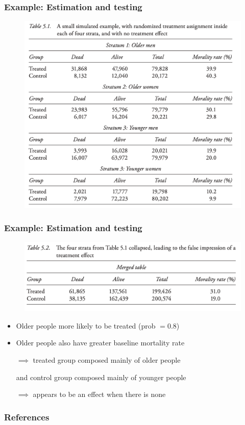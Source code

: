 \documentclass[table, xcolor = {dvipsnames}, 9pt]{beamer}
\theoremstyle{plain}
\begin{document}
\begin{frame}[t]
\frametitle{Example: Estimation and testing}
\vfill
\begin{figure}
\includegraphics[width = 0.8\linewidth]{figures/Rosenbaum_2017_Table_5.1.png}
\caption{\citep[][p.~67]{rosenbaum2017}}
\end{figure}
\vfill 
\end{frame}
\begin{frame}[t]
\frametitle{Example: Estimation and testing}
\vfill
\begin{figure}
\includegraphics[width = \linewidth]{figures/Rosenbaum_2017_Table_5.2.png}
\caption{\citep[][p.~69]{rosenbaum2017}}
\end{figure}
\vfill 
\begin{itemize} \vfill
\item Older people more likely to be treated (prob $= 0.8$) \vfill
\item Older people also have greater baseline mortality rate \vfill
\item[$\implies$]  treated group composed mainly of older people \vfill
\item[] and control group composed mainly of younger people \vfill
\item[$\implies$] appears to be an effect when there is none \vfill
\end{itemize} \vfill 
\end{frame}
\begin{frame}[allowframebreaks]
\frametitle{References} 
\scriptsize

\end{frame}
\end{document}
